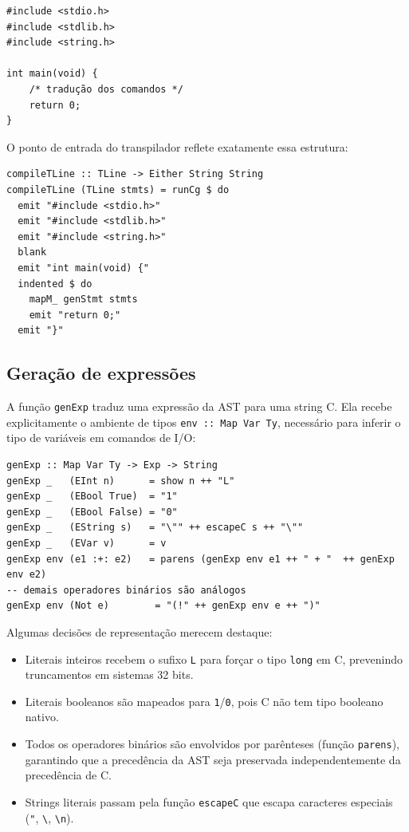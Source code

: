 \begin{verbatim}
#include <stdio.h>
#include <stdlib.h>
#include <string.h>

int main(void) {
    /* tradução dos comandos */
    return 0;
}
\end{verbatim}

O ponto de entrada do transpilador reflete exatamente essa estrutura:

\begin{verbatim}
compileTLine :: TLine -> Either String String
compileTLine (TLine stmts) = runCg $ do
  emit "#include <stdio.h>"
  emit "#include <stdlib.h>"
  emit "#include <string.h>"
  blank
  emit "int main(void) {"
  indented $ do
    mapM_ genStmt stmts
    emit "return 0;"
  emit "}"
\end{verbatim}

\subsection{Geração de expressões}

A função \texttt{genExp} traduz uma expressão da AST para uma string C.
Ela recebe explicitamente o ambiente de tipos \texttt{env :: Map Var Ty},
necessário para inferir o tipo de variáveis em comandos de I/O:

\begin{verbatim}
genExp :: Map Var Ty -> Exp -> String
genExp _   (EInt n)      = show n ++ "L"
genExp _   (EBool True)  = "1"
genExp _   (EBool False) = "0"
genExp _   (EString s)   = "\"" ++ escapeC s ++ "\""
genExp _   (EVar v)      = v
genExp env (e1 :+: e2)   = parens (genExp env e1 ++ " + "  ++ genExp env e2)
-- demais operadores binários são análogos
genExp env (Not e)        = "(!" ++ genExp env e ++ ")"
\end{verbatim}

Algumas decisões de representação merecem destaque:

\begin{itemize}
  \item Literais inteiros recebem o sufixo \texttt{L} para forçar o tipo
    \texttt{long} em C, prevenindo truncamentos em sistemas 32 bits.
  \item Literais booleanos são mapeados para \texttt{1}/\texttt{0}, pois C
    não tem tipo booleano nativo.
  \item Todos os operadores binários são envolvidos por parênteses (função
    \texttt{parens}), garantindo que a precedência da AST seja preservada
    independentemente da precedência de C.
  \item Strings literais passam pela função \texttt{escapeC} que escapa
    caracteres especiais (\texttt{"}, \texttt{\textbackslash},
    \texttt{\textbackslash n}).
\end{itemize}

